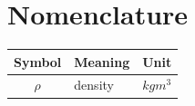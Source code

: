 \section{Nomenclature}
\begin{center}
  \begin{tabular}{c l c}
    \toprule
    Symbol & Meaning & Unit \\
    \midrule
    $\rho$ & density & $kg m^3$ \\
    \bottomrule
  \end{tabular}
\end{center}